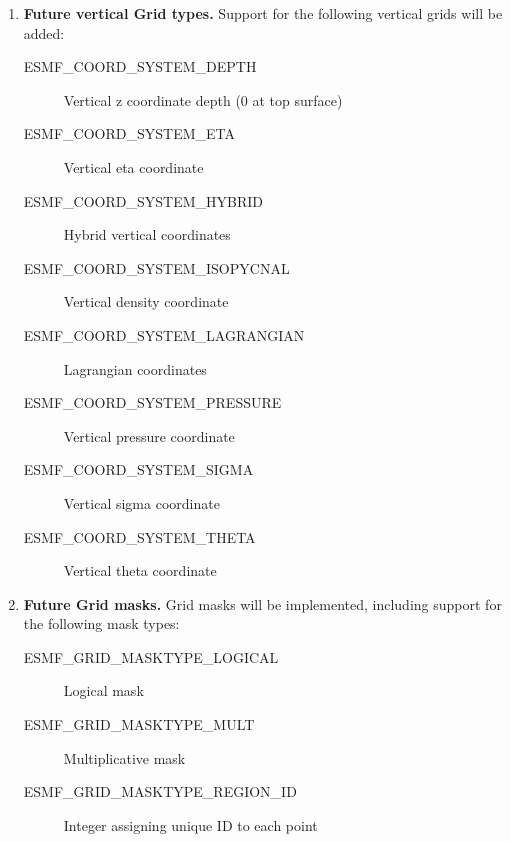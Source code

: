 \begin{enumerate}
\item {\bf Future vertical Grid types.}  Support for the following
vertical grids will be added:
 \begin{description}
    \item [ESMF\_COORD\_SYSTEM\_DEPTH]
          Vertical z coordinate depth (0 at top surface)
    \item [ESMF\_COORD\_SYSTEM\_ETA]
          Vertical eta coordinate
    \item [ESMF\_COORD\_SYSTEM\_HYBRID]
          Hybrid vertical coordinates
    \item [ESMF\_COORD\_SYSTEM\_ISOPYCNAL]
          Vertical density coordinate
    \item [ESMF\_COORD\_SYSTEM\_LAGRANGIAN]
          Lagrangian coordinates
    \item [ESMF\_COORD\_SYSTEM\_PRESSURE]
          Vertical pressure coordinate
    \item [ESMF\_COORD\_SYSTEM\_SIGMA]
          Vertical sigma coordinate
    \item [ESMF\_COORD\_SYSTEM\_THETA]
          Vertical theta coordinate
 \end{description}

\item {\bf Future Grid masks.}  Grid masks will be implemented, including
support for the following mask types:
 \begin{description}
    \item [ESMF\_GRID\_MASKTYPE\_LOGICAL]
          Logical mask
    \item [ESMF\_GRID\_MASKTYPE\_MULT]
          Multiplicative mask
    \item [ESMF\_GRID\_MASKTYPE\_REGION\_ID]
          Integer assigning unique ID to each point
 \end{description}

\end{enumerate}


